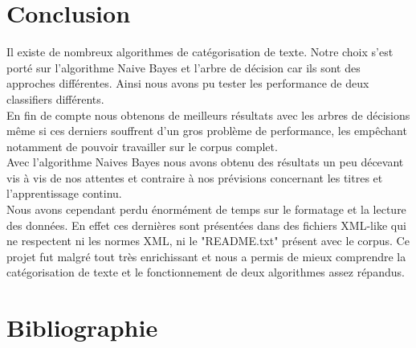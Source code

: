 \section*{Conclusion}

Il existe de nombreux algorithmes de catégorisation de texte. Notre choix s'est porté sur l'algorithme Naive Bayes et l'arbre de décision car ils sont des approches différentes. Ainsi nous avons pu tester les performance de deux classifiers différents.\\
En fin de compte nous obtenons de meilleurs résultats avec les arbres de décisions même si ces derniers souffrent d'un gros problème de performance, les empêchant notamment de pouvoir travailler sur le corpus complet.\\
Avec l'algorithme Naives Bayes nous avons obtenu des résultats un peu décevant vis à vis de nos attentes et contraire à nos prévisions concernant les titres et l'apprentissage continu.\\
Nous avons cependant perdu énormément de temps sur le formatage et la lecture des données. En effet ces dernières sont présentées dans des fichiers XML-like qui ne respectent ni les normes XML, ni le "README.txt" présent avec le corpus. 
Ce projet fut malgré tout très enrichissant et nous a permis de mieux comprendre la catégorisation de texte et le fonctionnement de deux algorithmes assez répandus. \\
\newpage

\section*{Bibliographie}

\begin{thebibliography}{99}


\end{thebibliography}
